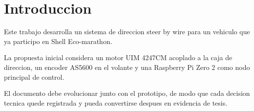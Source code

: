 \chapter{Introduccion}

Este trabajo desarrolla un sistema de direccion steer by wire para un vehiculo que ya participo en Shell Eco-marathon.

La propuesta inicial considera un motor UIM 4247CM acoplado a la caja de direccion, un encoder AS5600 en el volante y una Raspberry Pi Zero 2 como nodo principal de control.

El documento debe evolucionar junto con el prototipo, de modo que cada decision tecnica quede registrada y pueda convertirse despues en evidencia de tesis.
